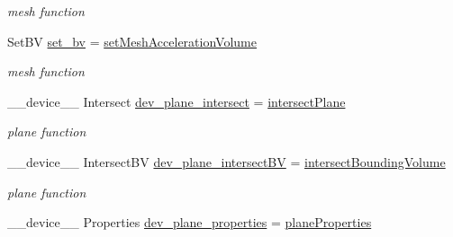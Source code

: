 \begin{DoxyCompactItemize}
\begin{DoxyCompactList}\small\item\em mesh function \end{DoxyCompactList}\item 
Set\+BV \hyperlink{group__device__pointers_gab0ffce09c75b9b50bae6f2a547e8302e}{set\+\_\+bv} = \hyperlink{group__intersection__test__prperties_ga672ecbee3aea2f5567ad7a2611feef3e}{set\+Mesh\+Acceleration\+Volume}\hypertarget{group__device__pointers_gab0ffce09c75b9b50bae6f2a547e8302e}{}\label{group__device__pointers_gab0ffce09c75b9b50bae6f2a547e8302e}

\begin{DoxyCompactList}\small\item\em mesh function \end{DoxyCompactList}\item 
\+\_\+\+\_\+device\+\_\+\+\_\+ Intersect \hyperlink{group__device__pointers_ga9e46bdfb1fa506ed7f5f6c6e11ebc091}{dev\+\_\+plane\+\_\+intersect} = \hyperlink{group__intersection__test__prperties_gafbcfd99d540347f9f63d01d6d0b6eef5}{intersect\+Plane}\hypertarget{group__device__pointers_ga9e46bdfb1fa506ed7f5f6c6e11ebc091}{}\label{group__device__pointers_ga9e46bdfb1fa506ed7f5f6c6e11ebc091}

\begin{DoxyCompactList}\small\item\em plane function \end{DoxyCompactList}\item 
\+\_\+\+\_\+device\+\_\+\+\_\+ Intersect\+BV \hyperlink{group__device__pointers_gad02954a9c76716ef59d8eda0101e15c7}{dev\+\_\+plane\+\_\+intersect\+BV} = \hyperlink{group__intersection__test__prperties_gaf6bbee9e8a6ee564017fa94cd9e6ec63}{intersect\+Bounding\+Volume}\hypertarget{group__device__pointers_gad02954a9c76716ef59d8eda0101e15c7}{}\label{group__device__pointers_gad02954a9c76716ef59d8eda0101e15c7}

\begin{DoxyCompactList}\small\item\em plane function \end{DoxyCompactList}\item 
\+\_\+\+\_\+device\+\_\+\+\_\+ Properties \hyperlink{group__device__pointers_ga31299a8a293d1f8fd1307f1e47b19b21}{dev\+\_\+plane\+\_\+properties} = \hyperlink{group__intersection__test__prperties_gae25700b3104d615db9d575d086c3d994}{plane\+Properties}\hypertarget{group__device__pointers_ga31299a8a293d1f8fd1307f1e47b19b21}{}\label{group__device__pointers_ga31299a8a293d1f8fd1307f1e47b19b21}


\end{DoxyCompactItemize}
